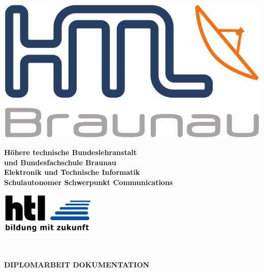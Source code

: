 \begin{minipage}[c]{0.20\linewidth}
\includegraphics[width=0.8\linewidth]{media/images/htl_c_cmyk_rein}
\end{minipage}
\begin{minipage}[c]{0.6\linewidth}
\begin{center}
{\bfseries\sffamily\large Höhere  technische  Bundeslehranstalt\\
und  Bundesfachschule  Braunau\\
Elektronik und Technische Informatik\\
{\normalsize Schulautonomer Schwerpunkt Communications} }
\end{center}
\end{minipage}
\begin{minipage}[c]{0.2\linewidth}
\hfill \includegraphics[width=0.8\linewidth]{media/images/htl-bildung-mit-zukunft}
\end{minipage}\\

\vspace{1em}
\begin{center}
\bfseries\sffamily\Large
DIPLOMARBEIT DOKUMENTATION
\end{center}
\vspace{1ex}

